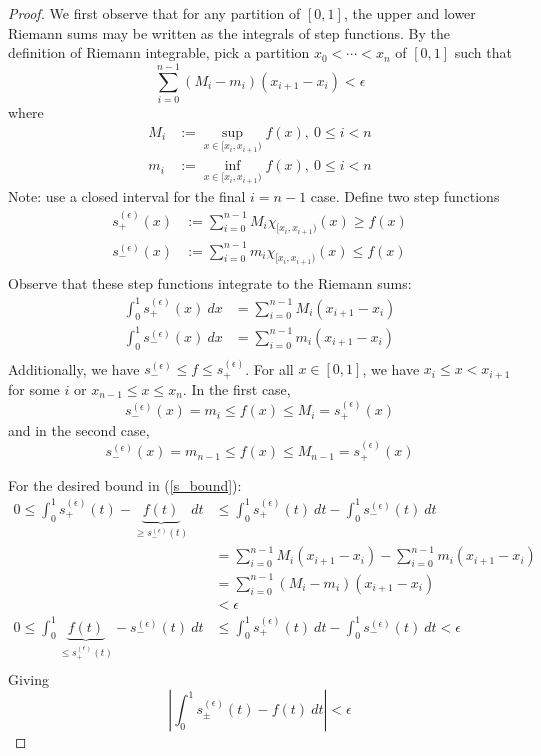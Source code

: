 \documentclass[12pt, reqno]{amsart}
\theoremstyle{definition}
\theoremstyle{remark}
\begin{document}
\begin{itemize}
\begin{itemize}
\begin{proof}
We first observe that for any partition of $[0,1]$, the upper and lower Riemann sums may be written as the integrals of step functions. By the definition of Riemann integrable, pick a partition $x_{0}<\cdots<x_{n}$ of $[0,1]$ such that 
 $$\sum_{i=0}^{n-1} (M_{i}-m_{i})(x_{i+1}-x_{i})<\epsilon$$
where \begin{align*}
M_{i}&:= \sup_{x\in[x_{i},x_{i+1})}f(x),~0\le i<n\\
m_{i}&:= \inf_{x\in[x_{i},x_{i+1})}f(x),~0\le i<n
\end{align*}
Note: use a closed interval for the final $i=n-1$ case. Define two step functions \begin{align*}
s^{(\epsilon)}_{+}(x)&:= \sum_{i=0}^{n-1}M_{i}\chi_{[x_{i},x_{i+1})}(x)\ge f(x)\\
s^{(\epsilon)}_{-}(x)&:= \sum_{i=0}^{n-1}m_{i}\chi_{[x_{i},x_{i+1})}(x)\le f(x)\\
\end{align*}
Observe that these step functions integrate to the Riemann sums: \begin{align*}
\int_{0}^{1}s_{+}^{(\epsilon)}(x)\ dx&= \sum_{i=0}^{n-1}M_{i}(x_{i+1}-x_{i})\\
\int_{0}^{1}s_{-}^{(\epsilon)}(x)\ dx&= \sum_{i=0}^{n-1}m_{i}(x_{i+1}-x_{i})\\
\end{align*}
Additionally, we have $s_-^{(\epsilon)}\le f\le s_+^{(\epsilon)}$. For all $x\in[0,1]$, we have $x_i\le x<x_{i+1}$ for some $i$ or $x_{n-1}\le x\le x_n$. In the first case,
\[
    s_-^{(\epsilon)}(x)=m_i\le f(x)\le M_i=s_+^{(\epsilon)}(x)
\]  
and in the second case,
\[
    s_-^{(\epsilon)}(x)=m_{n-1}\le f(x)\le M_{n-1}=s_+^{(\epsilon)}(x)
\]

For the desired bound in (\ref{s_bound}):
\begin{align*}
0\le\int_{0}^{1}s_{+}^{(\epsilon)}(t)-\underbrace{f(t)}_{\ge s_{-}^{(\epsilon)}(t)}\ dt&\le \int_{0}^{1}s^{(\epsilon)}_{+}(t)\ dt-\int_{0}^{1}s^{(\epsilon)}_{-}(t)\ dt\\
&= \sum_{i=0}^{n-1}M_{i}(x_{i+1}-x_{i})-\sum_{i=0}^{n-1}m_{i}(x_{i+1}-x_{i})\\
&= \sum_{i=0}^{n-1}(M_{i}-m_{i})(x_{i+1}-x_{i})\\
&< \epsilon\\
0\le\int_{0}^{1}\underbrace{f(t)}_{\le s_{+}^{(\epsilon)}(t)}-s_-^{(\epsilon)}(t)\ dt&\le \int_{0}^{1}s^{(\epsilon)}_{+}(t)\ dt-\int_{0}^{1}s^{(\epsilon)}_{-}(t)\ dt< \epsilon\\
\end{align*}
Giving $$\left|\int_{0}^{1}s_{\pm}^{(\epsilon)}(t)-f(t)~dt\right|<\epsilon$$


\end{proof}
\end{itemize}
\end{itemize}
\end{document}
